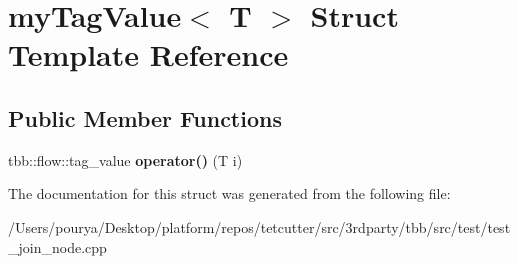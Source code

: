 \hypertarget{structmyTagValue}{}\section{my\+Tag\+Value$<$ T $>$ Struct Template Reference}
\label{structmyTagValue}
\subsection*{Public Member Functions}
\begin{DoxyCompactItemize}
\item 
\hypertarget{structmyTagValue_a0d11774c6a597f6ecf199930244a57ac}{}tbb\+::flow\+::tag\+\_\+value {\bfseries operator()} (T i)\label{structmyTagValue_a0d11774c6a597f6ecf199930244a57ac}

\end{DoxyCompactItemize}


The documentation for this struct was generated from the following file\+:\begin{DoxyCompactItemize}
\item 
/\+Users/pourya/\+Desktop/platform/repos/tetcutter/src/3rdparty/tbb/src/test/test\+\_\+join\+\_\+node.\+cpp\end{DoxyCompactItemize}
